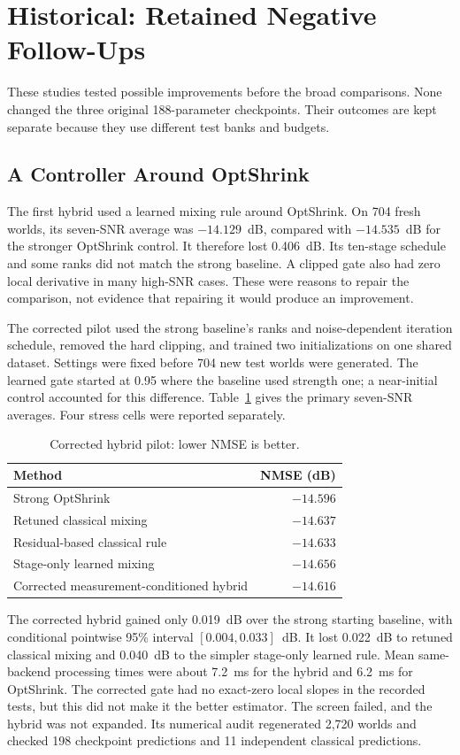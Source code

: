 \section{Historical: Retained Negative Follow-Ups}
These studies tested possible improvements before the broad comparisons.
None changed the three original 188-parameter checkpoints. Their outcomes
are kept separate because they use different test banks and budgets.

\subsection{A Controller Around OptShrink}
The first hybrid used a learned mixing rule around OptShrink. On 704 fresh
worlds, its seven-SNR average was $-14.129$~dB, compared with
$-14.535$~dB for the stronger OptShrink control. It therefore lost
0.406~dB. Its ten-stage schedule and some ranks did not match the strong
baseline. A clipped gate also had zero local derivative in many high-SNR
cases. These were reasons to repair the comparison, not evidence that
repairing it would produce an improvement.

The corrected pilot used the strong baseline's ranks and noise-dependent
iteration schedule, removed the hard clipping, and trained two
initializations on one shared dataset. Settings were fixed before 704 new
test worlds were generated. The learned gate started at 0.95 where the
baseline used strength one; a near-initial control accounted for this
difference. Table~\ref{tab:hybrid-retained} gives the primary seven-SNR
averages. Four stress cells were reported separately.

\begin{table}[!t]
\caption{Corrected hybrid pilot: lower NMSE is better.}
\label{tab:hybrid-retained}\centering\small
\begin{tabular}{@{}lr@{}}\toprule
Method & NMSE (dB)\\\midrule
Strong OptShrink & $-14.596$\\
Retuned classical mixing & $-14.637$\\
Residual-based classical rule & $-14.633$\\
Stage-only learned mixing & $-14.656$\\
Corrected measurement-conditioned hybrid & $-14.616$\\\bottomrule
\end{tabular}
\end{table}

The corrected hybrid gained only 0.019~dB over the strong starting
baseline, with conditional pointwise 95\% interval
$[0.004,0.033]$~dB. It lost 0.022~dB to retuned classical mixing and
0.040~dB to the simpler stage-only learned rule. Mean same-backend
processing times were about 7.2~ms for the hybrid and 6.2~ms for
OptShrink. The corrected gate had no exact-zero local slopes in the
recorded tests, but this did not make it the better estimator. The
screen failed, and the hybrid was not expanded. Its numerical audit
regenerated 2,720 worlds and checked 198 checkpoint predictions and
11 independent classical predictions.

